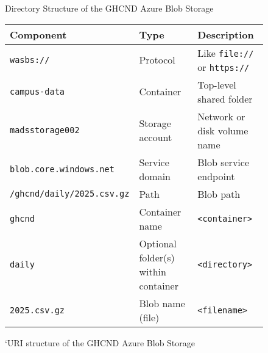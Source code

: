 \documentclass[11pt]{article}
\begin{document}
\begin{figure}[H]
    \centering
\caption{Directory Structure of the GHCND Azure Blob Storage}
\label{fig-ghcnd-tree}
\end{figure}
\begin{figure}[htbp] 
    \centering
    \begin{minipage}{0.7\textwidth}
    \centering
    
\begin{tabular}{@{}L{0.50\textwidth} L{0.20\textwidth} L{0.40\textwidth}@{}}
\toprule
\textbf{Component} & \textbf{Type} & \textbf{Description} \\
\midrule
\texttt{wasbs://} & Protocol & Like \texttt{file://} or \texttt{https://}\vspace{0.5\baselineskip} \\
\texttt{campus-data} & Container & Top-level shared folder\vspace{0.5\baselineskip} \\
\texttt{madsstorage002} & Storage account\vspace{0.5\baselineskip} & Network or disk volume name \\
\texttt{blob.core.windows.net} & Service domain\vspace{0.5\baselineskip} & Blob service endpoint  \\
\texttt{/ghcnd/daily/2025.csv.gz} & Path & Blob path\vspace{0.5\baselineskip} \\
\texttt{ghcnd} & Container name\vspace{0.5\baselineskip} & \texttt{<container>} \\
\texttt{daily} & Optional folder(s) within container\vspace{0.5\baselineskip} & \texttt{<directory>}\\
\texttt{2025.csv.gz} & Blob name (file) &  \texttt{<filename>} \\
\bottomrule
\end{tabular}
\caption{`URI structure of the GHCND Azure Blob Storage}
\label{fig-azure-url}
\end{minipage}
\end{figure}
\bigskip
\end{document}
